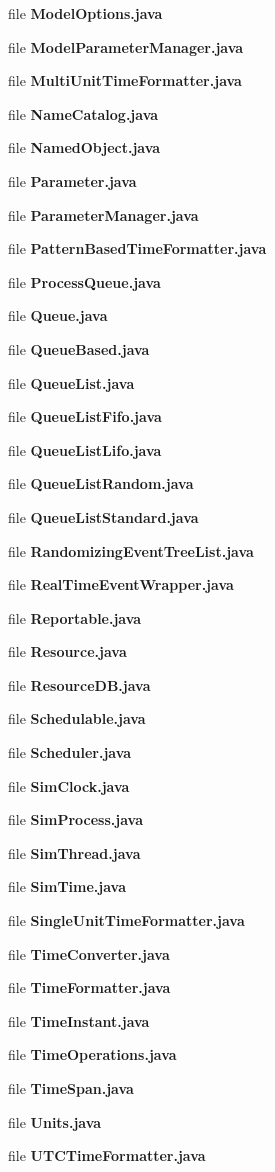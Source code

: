 \begin{DoxyCompactItemize}
file {\bfseries Model\-Options.\-java}
\item 
file {\bfseries Model\-Parameter\-Manager.\-java}
\item 
file {\bfseries Multi\-Unit\-Time\-Formatter.\-java}
\item 
file {\bfseries Name\-Catalog.\-java}
\item 
file {\bfseries Named\-Object.\-java}
\item 
file {\bfseries Parameter.\-java}
\item 
file {\bfseries Parameter\-Manager.\-java}
\item 
file {\bfseries Pattern\-Based\-Time\-Formatter.\-java}
\item 
file {\bfseries Process\-Queue.\-java}
\item 
file {\bfseries Queue.\-java}
\item 
file {\bfseries Queue\-Based.\-java}
\item 
file {\bfseries Queue\-List.\-java}
\item 
file {\bfseries Queue\-List\-Fifo.\-java}
\item 
file {\bfseries Queue\-List\-Lifo.\-java}
\item 
file {\bfseries Queue\-List\-Random.\-java}
\item 
file {\bfseries Queue\-List\-Standard.\-java}
\item 
file {\bfseries Randomizing\-Event\-Tree\-List.\-java}
\item 
file {\bfseries Real\-Time\-Event\-Wrapper.\-java}
\item 
file {\bfseries Reportable.\-java}
\item 
file {\bfseries Resource.\-java}
\item 
file {\bfseries Resource\-D\-B.\-java}
\item 
file {\bfseries Schedulable.\-java}
\item 
file {\bfseries Scheduler.\-java}
\item 
file {\bfseries Sim\-Clock.\-java}
\item 
file {\bfseries Sim\-Process.\-java}
\item 
file {\bfseries Sim\-Thread.\-java}
\item 
file {\bfseries Sim\-Time.\-java}
\item 
file {\bfseries Single\-Unit\-Time\-Formatter.\-java}
\item 
file {\bfseries Time\-Converter.\-java}
\item 
file {\bfseries Time\-Formatter.\-java}
\item 
file {\bfseries Time\-Instant.\-java}
\item 
file {\bfseries Time\-Operations.\-java}
\item 
file {\bfseries Time\-Span.\-java}
\item 
file {\bfseries Units.\-java}
\item 
file {\bfseries U\-T\-C\-Time\-Formatter.\-java}
\end{DoxyCompactItemize}
